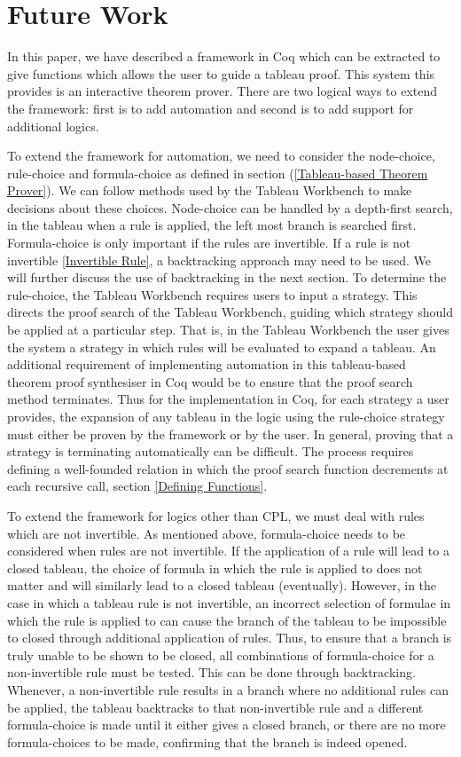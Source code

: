 \documentclass{llncs}
\begin{document}
\section{Future Work}
%
In this paper, we have described a framework in Coq which can be extracted to
give functions which allows the user to guide a tableau proof. This system this
provides is an interactive theorem prover. There are two logical ways to extend
the framework: first is to add automation and second is to add support for
additional logics.

To extend the framework for automation, we need to consider the node-choice,
rule-choice and formula-choice as defined in section (\ref{Tableau-based
Theorem Prover}). We can follow methods used by the Tableau Workbench
\cite{abate2007tableau} to make decisions about these choices.  Node-choice can
be handled by a depth-first search, in the tableau when a rule is applied, the
left most branch is searched first.  Formula-choice is only important if the
rules are invertible. If a rule is not invertible \ref{Invertible Rule}, a
backtracking approach may need to be used. We will further discuss the use of
backtracking in the next section. To determine the rule-choice, the Tableau
Workbench requires users to input a strategy. This directs the proof search of
the Tableau Workbench, guiding which strategy should be applied at a particular
step. That is, in the Tableau Workbench the user gives the system a strategy in
which rules will be evaluated to expand a tableau. An additional requirement of
implementing automation in this tableau-based theorem proof synthesiser in Coq
would be to ensure that the proof search method terminates. Thus for the
implementation in Coq, for each strategy a user provides, the expansion of any
tableau in the logic using the rule-choice strategy must either be proven by
the framework or by the user. In general, proving that a strategy is
terminating automatically can be difficult. The process requires defining a
well-founded relation in which the proof search function decrements at each
recursive call, section \ref{Defining Functions}.

To extend the framework for logics other than CPL, we must deal with rules
which are not invertible. As mentioned above, formula-choice needs to be
considered when rules are not invertible. If the application of a rule will
lead to a closed tableau, the choice of formula in which the rule is applied to
does not matter and will similarly lead to a closed tableau (eventually).
However, in the case in which a tableau rule is not invertible, an incorrect
selection of formulae in which the rule is applied to can cause the branch of
the tableau to be impossible to closed through additional application of rules.
Thus, to ensure that a branch is truly unable to be shown to be closed, all
combinations of formula-choice for a non-invertible rule must be tested. This
can be done through backtracking. Whenever, a non-invertible rule results in a
branch where no additional rules can be applied, the tableau backtracks to that
non-invertible rule and a different formula-choice is made until it either
gives a closed branch, or there are no more formula-choices to be made,
confirming that the branch is indeed opened.
%
\end{document}
